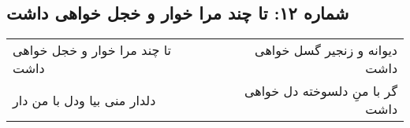 \begin{center}
\section*{شماره ۱۲: تا چند مرا خوار و خجل خواهی داشت}
\label{sec:012}
\begin{longtable}{l p{0.5cm} r}
تا چند مرا خوار و خجل خواهی داشت
&&
دیوانه و زنجیر گسل خواهی داشت
\\
دلدار منی بیا ودل با من دار
&&
گر با منِ دلسوخته دل خواهی داشت
\\
\end{longtable}
\end{center}
